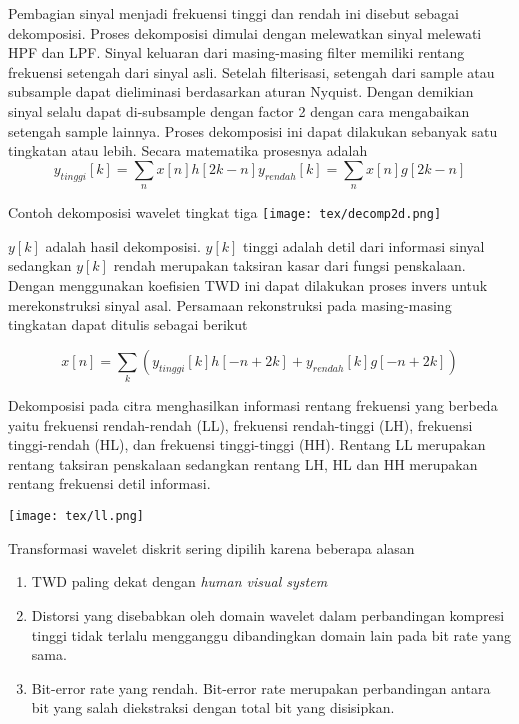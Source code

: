 \documentclass[laporan.tex]{subfiles}
\begin{document}
Pembagian sinyal menjadi frekuensi tinggi dan rendah ini disebut sebagai dekomposisi. Proses dekomposisi dimulai dengan melewatkan sinyal melewati HPF dan LPF. Sinyal keluaran dari masing-masing filter memiliki rentang frekuensi setengah dari sinyal asli. Setelah filterisasi, setengah dari sample atau subsample dapat dieliminasi berdasarkan aturan Nyquist. Dengan demikian sinyal selalu dapat di-subsample dengan factor 2 dengan cara mengabaikan setengah sample lainnya. Proses dekomposisi ini dapat dilakukan sebanyak satu tingkatan atau lebih. Secara matematika prosesnya adalah
\begin{equation}
y_{tinggi}[k]=\sum_n x[n]h[2k-n]
y_{rendah}[k]=\sum_n x[n]g[2k-n]
\end{equation}

Contoh dekomposisi wavelet tingkat tiga
\texttt{[image: tex/decomp2d.png]}

$y[k]$ adalah hasil dekomposisi. $y[k]$ tinggi adalah detil dari informasi sinyal sedangkan $y[k]$ rendah merupakan taksiran kasar dari fungsi penskalaan. Dengan menggunakan koefisien TWD ini dapat dilakukan proses invers untuk merekonstruksi sinyal asal. Persamaan rekonstruksi pada masing-masing tingkatan dapat ditulis sebagai berikut

\begin{equation}
x[n]=\sum_k (y_{tinggi}[k]h[-n+2k]+y_{rendah}[k]g[-n+2k])
\end{equation}

Dekomposisi pada citra menghasilkan informasi rentang frekuensi yang berbeda yaitu frekuensi rendah-rendah (LL), frekuensi rendah-tinggi (LH), frekuensi tinggi-rendah (HL), dan frekuensi tinggi-tinggi (HH). Rentang LL merupakan rentang taksiran penskalaan sedangkan rentang LH, HL dan HH merupakan rentang frekuensi detil informasi.

\texttt{[image: tex/ll.png]}

Transformasi wavelet diskrit sering dipilih karena beberapa alasan

\begin{enumerate}
\item TWD paling dekat dengan \emph{human visual system}
\item Distorsi yang disebabkan oleh domain wavelet dalam perbandingan kompresi tinggi tidak terlalu mengganggu dibandingkan domain lain pada bit rate yang sama.
\item Bit-error rate yang rendah. Bit-error rate merupakan perbandingan antara bit yang salah diekstraksi dengan total bit yang disisipkan.
\end{enumerate}
\end{document}
